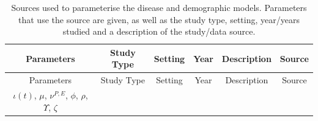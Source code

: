 \documentclass[11pt,twoside]{bristolthesis}
\begin{document}
  \begin{longtable}[]{@{}cccccc@{}}
  \caption{\label{tab:sources-tab} Sources used to parameterise the disease and demographic models. Parameters that use the source are given, as well as the study type, setting, year/years studied and a description of the study/data source.}\tabularnewline
  \toprule
  \begin{minipage}[b]{0.21\columnwidth}\centering
  Parameters\strut
  \end{minipage} & \begin{minipage}[b]{0.10\columnwidth}\centering
  Study Type\strut
  \end{minipage} & \begin{minipage}[b]{0.07\columnwidth}\centering
  Setting\strut
  \end{minipage} & \begin{minipage}[b]{0.07\columnwidth}\centering
  Year\strut
  \end{minipage} & \begin{minipage}[b]{0.27\columnwidth}\centering
  Description\strut
  \end{minipage} & \begin{minipage}[b]{0.11\columnwidth}\centering
  Source\strut
  \end{minipage}\tabularnewline
  \midrule
  \endfirsthead
  \toprule
  \begin{minipage}[b]{0.21\columnwidth}\centering
  Parameters\strut
  \end{minipage} & \begin{minipage}[b]{0.10\columnwidth}\centering
  Study Type\strut
  \end{minipage} & \begin{minipage}[b]{0.07\columnwidth}\centering
  Setting\strut
  \end{minipage} & \begin{minipage}[b]{0.07\columnwidth}\centering
  Year\strut
  \end{minipage} & \begin{minipage}[b]{0.27\columnwidth}\centering
  Description\strut
  \end{minipage} & \begin{minipage}[b]{0.11\columnwidth}\centering
  Source\strut
  \end{minipage}\tabularnewline
  \midrule
  \endhead
  \begin{minipage}[t]{0.21\columnwidth}\centering
  \(\iota(t)\),
  \(\mu\), \(\nu^{P, E}\), \(\phi\),
  \(\rho\),
  \(\Upsilon\),
  \(\zeta\)\strut
  \end{minipage} & \begin{minipage}[t]{0.10\columnwidth}\centering

\end{minipage}
\end{longtable}
\end{document}
